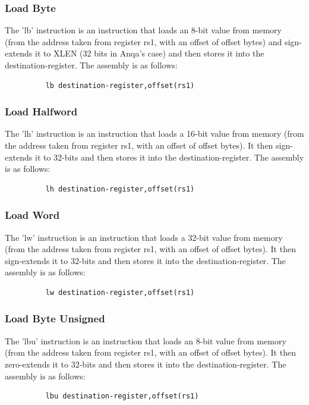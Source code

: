 \documentclass{article}
\begin{document}
\subsubsection{Load Byte}
\qquad
The 'lb' instruction is an instruction that loads an 8-bit value from memory (from the address taken from register rs1, with an offset of offset bytes) and sign-extends it to XLEN (32 bits in Anqa's case) and then stores it into the destination-register. The assembly is as follows:
\begin{figure}[!htbp]
    \centering
    \begin{verbatim}
    lb destination-register,offset(rs1)
    \end{verbatim}
\end{figure}\newline

\subsubsection{Load Halfword}
\qquad
The 'lh' instruction is an instruction that loads a 16-bit value from memory (from the address taken from register rs1, with an offset of offset bytes). It then sign-extends it to 32-bits and then stores it into the destination-register. The assembly is as follows:
\begin{figure}[!htbp]
    \centering
    \begin{verbatim}
    lh destination-register,offset(rs1)
    \end{verbatim}
\end{figure}\newline

\subsubsection{Load Word}
\qquad
The 'lw' instruction is an instruction that loads a 32-bit value from memory (from the address taken from register rs1, with an offset of offset bytes). It then sign-extends it to 32-bits and then stores it into the destination-register. The assembly is as follows:
\begin{figure}[!htbp]
    \centering
    \begin{verbatim}
    lw destination-register,offset(rs1)
    \end{verbatim}
\end{figure}\newline

\subsubsection{Load Byte Unsigned}
\qquad
The 'lbu' instruction is an instruction that loads an 8-bit value from memory (from the address taken from register rs1, with an offset of offset bytes). It then zero-extends it to 32-bits and then stores it into the destination-register. The assembly is as follows:
\begin{figure}[!htbp]
    \centering
    \begin{verbatim}
    lbu destination-register,offset(rs1)
    \end{verbatim}
\end{figure}\newline
\end{document}
